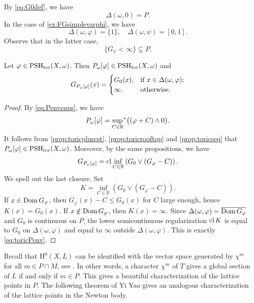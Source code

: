 \begin{example}\label{ex:toric-ample:L621}
    By \eqref{eq:G0def}, we have
    \[
    \Delta(\omega,0)=P.
    \]
    In the case of \cref{ex:FGsimplevarphi}, we have
    \[
    \Delta(\omega,\varphi)=\{1\},\quad \Delta(\omega,\psi)=[0,1].
    \]
    Observe that in the latter case,
    \[
    \{G_{\psi}<\infty\}\subsetneq P.
    \]
\end{example}


\begin{proposition}\label{prop:GPenvelope}
    Let $\varphi\in \PSH_{\tor}(X,\omega)$. Then $P_{\omega}[\varphi]\in \PSH_{\tor}(X,\omega)$ and
    \begin{equation}\label{eq:toricPenv}
    G_{P_{\omega}[\varphi]}(x)=
    \begin{cases}
        G_0(x),&\textup{if } x\in \Delta(\omega,\varphi);\\
        \infty,&\textup{otherwise}.
    \end{cases}
    \end{equation}
\end{proposition}
\begin{proof}
    By \eqref{eq:Penvsups}, we have
    \[
    P_{\omega}[\varphi]=\uscsup[C\in \mathbb{R}]\bigl((\varphi+C)\land 0\bigr).
    \]
    It follows from \cref{prop:toricpluscst}, \cref{prop:toricrooftop} and \cref{prop:toricseq} that $P_{\omega}[\varphi]\in \PSH_{\tor}(X,\omega)$. Moreover, by the same propositions, we have
    \[
    G_{P_{\omega}[\varphi]}=\cl \inf_{C\in \mathbb{R}} \left( G_{0}\lor (G_{\varphi}-C) \right).
    \]
    We spell out the last closure. Set
    \[
        K=\inf_{C\in \mathbb{R}} \left( G_{0}\lor (G_{\varphi}-C) \right).
    \]
    If $x\in \Dom G_{\varphi}$, then $G_{\varphi}(x)-C\leq G_0(x)$ for $C$ large enough, hence $K(x)=G_0(x)$. If $x\notin \Dom G_{\varphi}$, then $K(x)=\infty$. Since $\Delta(\omega,\varphi)=\overline{\Dom G_{\varphi}}$ and $G_0$ is continuous on $P$, the lower semicontinuous regularization $\cl K$ is equal to $G_0$ on $\Delta(\omega,\varphi)$ and equal to $\infty$ outside $\Delta(\omega,\varphi)$. This is exactly \eqref{eq:toricPenv}.

\end{proof}

Recall that $\mathrm{H}^0(X,L)$ can be identified with the vector space generated by $\chi^m$ for all $m\in P\cap M$, see \cite[Proposition~4.3.3]{CLS11}. In other words, a character $\chi^m$ of $T$ gives a global section of $L$ if and only if $m\in P$. This gives a beautiful characterization of the lattice points in $P$. The following theorem of Yi Yao gives an analogous characterization of the lattice points in the Newton body.

